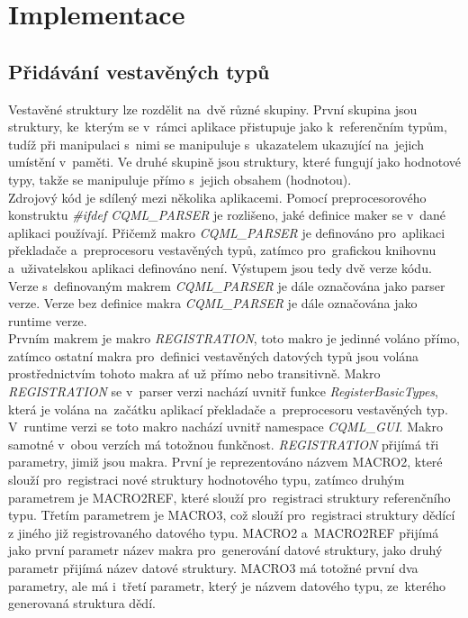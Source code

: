 \documentclass[11pt,twoside,a4paper]{book}
\begin{document}
\chapter{\label{CH:Impl}Implementace}
\section{\label{SEC:header}Přidávání vestavěných typů}
Vestavěné struktury lze rozdělit na~dvě různé skupiny. První skupina jsou struktury, ke~kterým se v~rámci aplikace přistupuje jako k~referenčním typům, tudíž při manipulaci s~nimi se manipuluje s~ukazatelem ukazující na~jejich umístění v~paměti. Ve druhé skupině jsou struktury, které fungují jako hodnotové typy, takže se manipuluje přímo s~jejich obsahem (hodnotou).\\
Zdrojový kód je sdílený mezi několika aplikacemi. Pomocí preprocesorového konstruktu \textit{\#ifdef CQML\_PARSER} je rozlišeno, jaké definice maker se v~dané aplikaci používají. Přičemž makro \textit{CQML\_PARSER} je definováno pro~aplikaci překladače a~preprocesoru vestavěných typů, zatímco pro~grafickou knihovnu a~uživatelskou aplikaci definováno není. Výstupem jsou tedy dvě verze kódu. Verze s~definovaným makrem \textit{CQML\_PARSER} je dále označována jako parser verze. Verze bez definice makra \textit{CQML\_PARSER} je dále označována jako runtime verze.\\
Prvním makrem je makro \textit{REGISTRATION}, toto makro je jedinné voláno přímo, zatímco ostatní makra pro~definici vestavěných datových typů jsou volána prostřednictvím tohoto makra ať už přímo nebo transitivně. Makro \textit{REGISTRATION} se v~parser verzi nachází uvnitř funkce \textit{RegisterBasicTypes}, která je volána na~začátku aplikací překladače a~preprocesoru vestavěných typ. V~runtime verzi se toto makro nachází uvnitř namespace \textit{CQML}\_\textit{GUI}. Makro samotné v~obou verzích má totožnou funkčnost. \textit{REGISTRATION} přijímá tři parametry, jimiž jsou makra. První je reprezentováno názvem MACRO2, které slouží pro~registraci nové struktury hodnotového typu, zatímco druhým parametrem je MACRO2REF, které slouží pro~registraci struktury referenčního typu. Třetím parametrem je MACRO3, což slouží pro~registraci struktury dědící z jiného již registrovaného datového typu. MACRO2 a~MACRO2REF přijímá jako první parametr název makra pro~generování datové struktury, jako druhý parametr přijímá název datové struktury. MACRO3 má totožné první dva parametry, ale má i~třetí parametr, který je názvem datového typu, ze~kterého generovaná struktura dědí. \\
\end{document}
